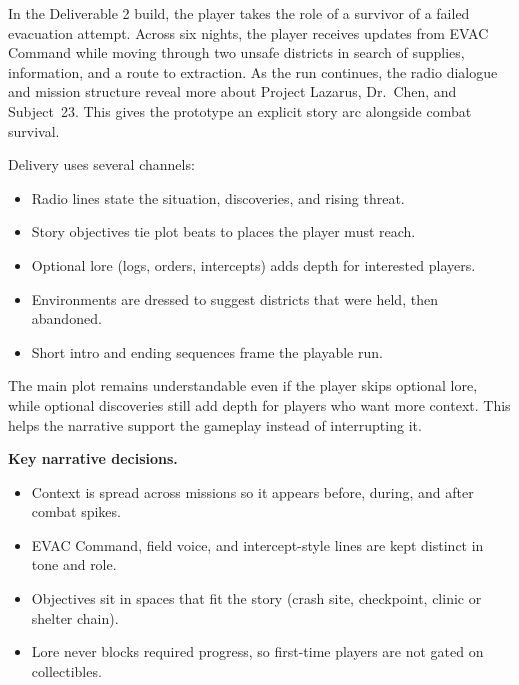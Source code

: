 \documentclass[11pt]{article}
\begin{document}
In the Deliverable 2 build, the player takes the role of a survivor of a failed evacuation attempt. Across six nights, the player receives updates from EVAC Command while moving through two unsafe districts in search of supplies, information, and a route to extraction. As the run continues, the radio dialogue and mission structure reveal more about Project Lazarus, Dr.~Chen, and Subject~23. This gives the prototype an explicit story arc alongside combat survival.

Delivery uses several channels:

\begin{itemize}
    \item Radio lines state the situation, discoveries, and rising threat.
    \item Story objectives tie plot beats to places the player must reach.
    \item Optional lore (logs, orders, intercepts) adds depth for interested players.
    \item Environments are dressed to suggest districts that were held, then abandoned.
    \item Short intro and ending sequences frame the playable run.
\end{itemize}

The main plot remains understandable even if the player skips optional lore, while optional discoveries still add depth for players who want more context. This helps the narrative support the gameplay instead of interrupting it.

\noindent\textbf{Key narrative decisions.}
\begin{itemize}
    \item Context is spread across missions so it appears before, during, and after combat spikes.
    \item EVAC Command, field voice, and intercept-style lines are kept distinct in tone and role.
    \item Objectives sit in spaces that fit the story (crash site, checkpoint, clinic or shelter chain).
    \item Lore never blocks required progress, so first-time players are not gated on collectibles.
\end{itemize}
\end{document}
